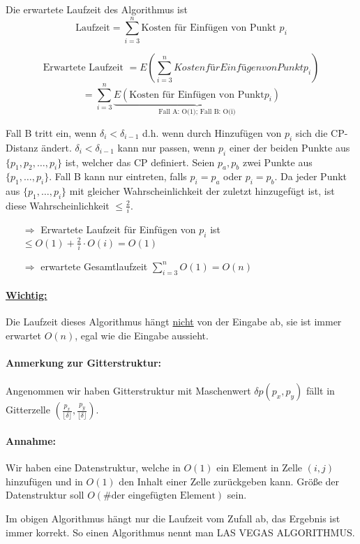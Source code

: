 Die erwartete Laufzeit des Algorithmus ist
\[ \text{Laufzeit} = \sum_{i=3}^n \text{Kosten für Einfügen von Punkt } p_i \]

\[\text{Erwartete Laufzeit }= E(\sum_{i=3}^n Kosten für Einfügen von Punkt p_i)\]
\[ = \sum_{i=3}^n \underbrace{E(\text{Kosten für Einfügen von Punkt} p_i)}_{\text{Fall A: O(1); Fall B: O(i)}} \]

Fall B tritt ein, wenn $\delta_i < \delta_{i-1}$ d.h. wenn durch Hinzufügen von $p_i$ sich die CP-Distanz ändert. $\delta_i < \delta_{i-1}$ kann nur passen, wenn $p_i$ einer der beiden Punkte aus $\{ p_1,p_2,\dots,p_i \}$ ist, welcher das CP definiert. Seien $p_a,p_b$ zwei Punkte aus $\{ p_1,\dots,p_i \}$. Fall B kann nur eintreten, falls $p_i = p_a$ oder $p_i = p_b$.
Da jeder Punkt aus $\{ p_1,\dots,p_i \}$ mit gleicher Wahrscheinlichkeit der zuletzt hinzugefügt ist, ist diese Wahrscheinlichkeit $\leq \frac{2}{i}$.
\begin{itemize}
	\item[$\Rightarrow$] Erwartete Laufzeit für Einfügen von $p_i$ ist $\leq O(1) + \frac{2}{i} \cdot O(i) = O(1)$
	\item[$\Rightarrow$] erwartete Gesamtlaufzeit $\sum\limits_{i=3}^n O(1) = O(n)$
\end{itemize}

\paragraph*{\underline{Wichtig:}} Die Laufzeit dieses Algorithmus hängt \underline{nicht} von der Eingabe ab, sie ist immer erwartet $O(n)$, egal wie die Eingabe aussieht.

\paragraph*{Anmerkung zur Gitterstruktur:} Angenommen wir haben Gitterstruktur mit Maschenwert $\delta p(p_x,p_y)$ fällt in Gitterzelle $(\frac{p_x}{\lfloor \delta \rfloor},\frac{p_y}{\lfloor \delta \rfloor})$.
\paragraph*{Annahme:} Wir haben eine Datenstruktur, welche in $O(1)$ ein Element in Zelle $(i,j)$ hinzufügen und in $O(1)$ den Inhalt einer Zelle zurückgeben kann. Größe der Datenstruktur soll $O(\text{\# der eingefügten Element})$ sein.

Im obigen Algorithmus hängt nur die Laufzeit vom Zufall ab, das Ergebnis ist immer korrekt. So einen Algorithmus nennt man LAS VEGAS ALGORITHMUS.

